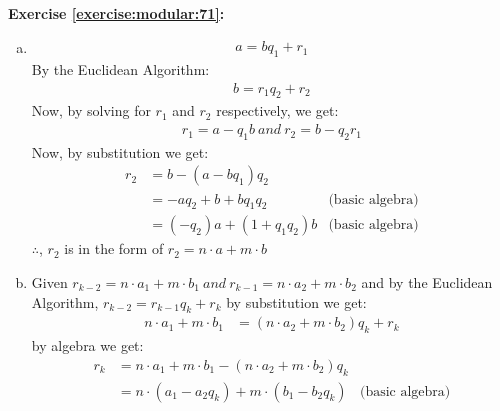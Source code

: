 \noindent\textbf{Exercise \ref{exercise:modular:71}:} %
\begin{enumerate}[(a)]
\item  
\begin{align*}
a = bq_{1} + r_{1}
\end{align*}
By the Euclidean Algorithm:
\begin{align*}
b = r_{1}q_{2} + r_{2} 
\end{align*}
Now, by solving for $r_{1}$ and $r_{2}$ respectively, we get:
\begin{align*}
r_{1} = a - q_{1}b\ and\ r_{2} = b - q_{2}r_{1}
\end{align*}
Now, by substitution we get:
\begin{align*}
r_{2} &= b - (a - bq_{1})q_{2} &\\ 
&= -aq_{2} + b + bq_{1}q_{2} &\text{(basic algebra)}\\
&= (-q_{2})a + (1 + q_{1}q_{2})b &\text{(basic algebra)}
\end{align*}
$\therefore$, $r_{2}$ is in the form of $r_{2} = n\cdot a + m\cdot b$

\item
Given $r_{k-2} = n\cdot a_{1} + m\cdot b_{1}\ and\ r_{k-1} = n\cdot a_{2} + m\cdot b_{2}$ and by the Euclidean Algorithm, $r_{k-2} = r_{k-1}q_{k} + r_{k}$ by substitution we get:
\begin{align*}
n\cdot a_{1} + m\cdot b_{1} &= (n\cdot a_{2} + m\cdot b_{2})q_{k} + r_{k}
\end{align*}
by algebra we get:
\begin{align*}
r_{k} &= n\cdot a_{1} + m\cdot b_{1} - (n\cdot a_{2} + m\cdot b_{2})q_{k} &\\
&= n\cdot(a_{1} - a_{2}q_{k}) + m\cdot (b_{1} - b_{2}q_{k}) &\text{(basic~algebra)}
\end{align*}


\end{enumerate}
